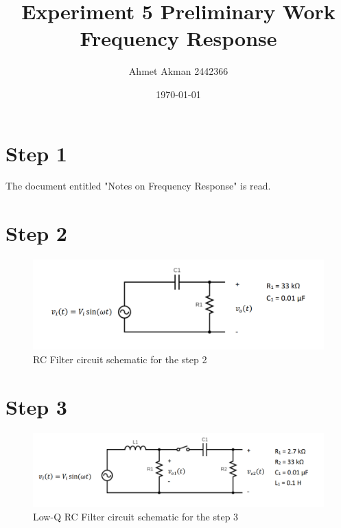 \documentclass[letterpaper,12pt]{article}
\begin{document}
\title{Experiment 5 Preliminary Work \protect\\ Frequency Response}
\author{Ahmet Akman 2442366 \protect\\}
\date{\today}
\maketitle
\tableofcontents

\section{Step 1}
The document entitled "Notes on Frequency Response" is read.
\section{Step 2}
\begin{figure}[H]
    \centering
    \includegraphics[width=1\textwidth]{RCfilter.png}
    \caption{RC Filter circuit schematic for the step 2}
\end{figure} 
\section{Step 3}
\begin{figure}[H]
    \centering
    \includegraphics[width=1\textwidth]{lowq.png}
    \caption{Low-Q RC Filter circuit schematic for the step 3}
\end{figure} 
\end{document}
